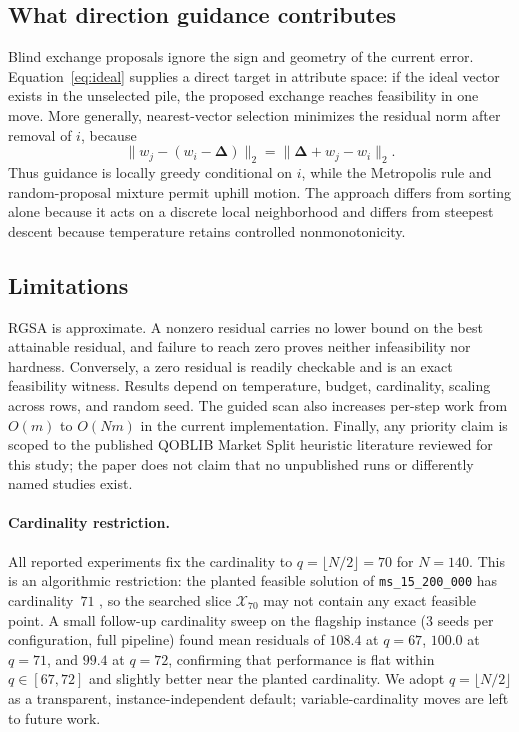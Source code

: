 \documentclass[11pt]{article}
\newcommand{\res}{\boldsymbol{\Delta}}
\begin{document}
\subsection{What direction guidance contributes}
Blind exchange proposals ignore the sign and geometry of the current error. Equation~\eqref{eq:ideal} supplies a direct target in attribute space: if the ideal vector exists in the unselected pile, the proposed exchange reaches feasibility in one move. More generally, nearest-vector selection minimizes the residual norm after removal of $i$, because
\[
 \|w_j-(w_i-\res)\|_2=\|\res+w_j-w_i\|_2.
\]
Thus guidance is locally greedy conditional on $i$, while the Metropolis rule and random-proposal mixture permit uphill motion. The approach differs from sorting alone because it acts on a discrete local neighborhood and differs from steepest descent because temperature retains controlled nonmonotonicity.

\subsection{Limitations}
RGSA is approximate. A nonzero residual carries no lower bound on the best attainable residual, and failure to reach zero proves neither infeasibility nor hardness. Conversely, a zero residual is readily checkable and is an exact feasibility witness. Results depend on temperature, budget, cardinality, scaling across rows, and random seed. The guided scan also increases per-step work from $O(m)$ to $O(Nm)$ in the current implementation. Finally, any priority claim is scoped to the published QOBLIB Market Split heuristic literature reviewed for this study; the paper does not claim that no unpublished runs or differently named studies exist.

\paragraph{Cardinality restriction.}
All reported experiments fix the cardinality to $q=\lfloor N/2\rfloor=70$ for $N=140$. This is an algorithmic restriction: the planted feasible solution of \texttt{ms\_15\_200\_000} has cardinality~$71$ \cite{koch2025}, so the searched slice $\mathcal{X}_{70}$ may not contain any exact feasible point. A small follow-up cardinality sweep on the flagship instance (3 seeds per configuration, full pipeline) found mean residuals of $108.4$ at $q{=}67$, $100.0$ at $q{=}71$, and $99.4$ at $q{=}72$, confirming that performance is flat within $q\in[67,72]$ and slightly better near the planted cardinality. We adopt $q{=}\lfloor N/2\rfloor$ as a transparent, instance-independent default; variable-cardinality moves are left to future work.
\end{document}
